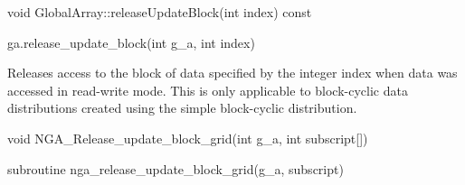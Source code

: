 \documentclass[12pt]{article}
\begin{document}
\begin{cxxapi}
\begin{cxxcode}
void GlobalArray::releaseUpdateBlock(int index) const
\end{cxxcode}
\begin{funcargs}
\end{funcargs}
\end{cxxapi}

\begin{pyapi}
\begin{pycode}
ga.release_update_block(int g_a, int index)
\end{pycode}
\begin{funcargs}
\end{funcargs}
\end{pyapi}

\local

\begin{desc}

Releases access to the block of data specified by the integer index when data
was accessed in read-write mode. This is only applicable to block-cyclic data
distributions created using the simple block-cyclic distribution.

\end{desc}



\begin{capi}
\begin{ccode}
void NGA_Release_update_block_grid(int g_a, int subscript[])
\end{ccode}
\begin{funcargs}
\end{funcargs}
\end{capi}

\begin{fapi}
\begin{fcode}
subroutine nga_release_update_block_grid(g_a, subscript)
\end{fcode}
\begin{funcargs}
\end{funcargs}
\end{fapi}
\end{document}

